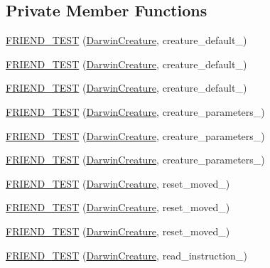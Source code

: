 \subsection*{Private Member Functions}
\begin{DoxyCompactItemize}
\item 
\hyperlink{classCreature_a0aa159518fa3645ebf9c0267ff5206c1}{F\-R\-I\-E\-N\-D\-\_\-\-T\-E\-S\-T} (\hyperlink{classCreature_a16df2cdab1d993dc2dcb9db1b56dd808}{Darwin\-Creature}, creature\-\_\-default\-\_)
\item 
\hyperlink{classCreature_a694324a98b1b4a87c05954bfb44bb06f}{F\-R\-I\-E\-N\-D\-\_\-\-T\-E\-S\-T} (\hyperlink{classCreature_a16df2cdab1d993dc2dcb9db1b56dd808}{Darwin\-Creature}, creature\-\_\-default\-\_)
\item 
\hyperlink{classCreature_a33c2a7f79d472c4906afe0e01b223e48}{F\-R\-I\-E\-N\-D\-\_\-\-T\-E\-S\-T} (\hyperlink{classCreature_a16df2cdab1d993dc2dcb9db1b56dd808}{Darwin\-Creature}, creature\-\_\-default\-\_)
\item 
\hyperlink{classCreature_a2f9305ef03148ca8b13dbeb05b7e762d}{F\-R\-I\-E\-N\-D\-\_\-\-T\-E\-S\-T} (\hyperlink{classCreature_a16df2cdab1d993dc2dcb9db1b56dd808}{Darwin\-Creature}, creature\-\_\-parameters\-\_)
\item 
\hyperlink{classCreature_a9578d72226d28e296a9d0339338c26a4}{F\-R\-I\-E\-N\-D\-\_\-\-T\-E\-S\-T} (\hyperlink{classCreature_a16df2cdab1d993dc2dcb9db1b56dd808}{Darwin\-Creature}, creature\-\_\-parameters\-\_)
\item 
\hyperlink{classCreature_a43437f9a2cf4ff82918bd540895e3366}{F\-R\-I\-E\-N\-D\-\_\-\-T\-E\-S\-T} (\hyperlink{classCreature_a16df2cdab1d993dc2dcb9db1b56dd808}{Darwin\-Creature}, creature\-\_\-parameters\-\_)
\item 
\hyperlink{classCreature_a675d3973a447ea2f1f0be0ab0cf79f7d}{F\-R\-I\-E\-N\-D\-\_\-\-T\-E\-S\-T} (\hyperlink{classCreature_a16df2cdab1d993dc2dcb9db1b56dd808}{Darwin\-Creature}, reset\-\_\-moved\-\_)
\item 
\hyperlink{classCreature_a7021859d484c44951ae9c9243f76ab05}{F\-R\-I\-E\-N\-D\-\_\-\-T\-E\-S\-T} (\hyperlink{classCreature_a16df2cdab1d993dc2dcb9db1b56dd808}{Darwin\-Creature}, reset\-\_\-moved\-\_)
\item 
\hyperlink{classCreature_a8f8b70d4014786362f9b3425dfe5130c}{F\-R\-I\-E\-N\-D\-\_\-\-T\-E\-S\-T} (\hyperlink{classCreature_a16df2cdab1d993dc2dcb9db1b56dd808}{Darwin\-Creature}, reset\-\_\-moved\-\_)
\item 
\hyperlink{classCreature_a1c565e682fe480827f97bc56873ea5cd}{F\-R\-I\-E\-N\-D\-\_\-\-T\-E\-S\-T} (\hyperlink{classCreature_a16df2cdab1d993dc2dcb9db1b56dd808}{Darwin\-Creature}, read\-\_\-instruction\-\_)

\end{DoxyCompactItemize}
